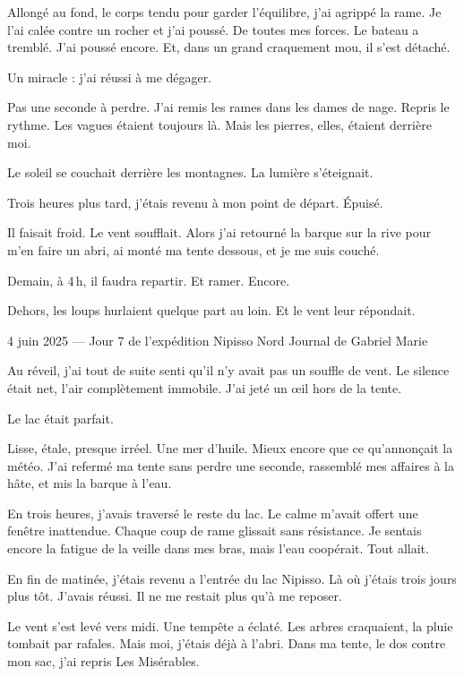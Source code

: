 Allongé au fond, le corps tendu pour garder l’équilibre, j’ai agrippé la rame. Je l’ai calée contre un rocher et j’ai poussé. De toutes mes forces. Le bateau a tremblé. J’ai poussé encore. Et, dans un grand craquement mou, il s’est détaché.

Un miracle : j’ai réussi à me dégager.

Pas une seconde à perdre. J’ai remis les rames dans les dames de nage. Repris le rythme. Les vagues étaient toujours là. Mais les pierres, elles, étaient derrière moi.

Le soleil se couchait derrière les montagnes. La lumière s’éteignait.

Trois heures plus tard, j’étais revenu à mon point de départ. Épuisé.

Il faisait froid. Le vent soufflait. Alors j’ai retourné la barque sur la rive pour m’en faire un abri, ai monté ma tente dessous, et je me suis couché.

Demain, à 4 h, il faudra repartir. Et ramer. Encore.

Dehors, les loups hurlaient quelque part au loin. Et le vent leur répondait.






4 juin 2025 — Jour 7 de l’expédition Nipisso Nord
Journal de Gabriel Marie

Au réveil, j’ai tout de suite senti qu’il n’y avait pas un souffle de vent. Le silence était net, l’air complètement immobile. J’ai jeté un œil hors de la tente.

Le lac était parfait.

Lisse, étale, presque irréel. Une mer d’huile. Mieux encore que ce qu’annonçait la météo. J’ai refermé ma tente sans perdre une seconde, rassemblé mes affaires à la hâte, et mis la barque à l’eau.

En trois heures, j’avais traversé le reste du lac. Le calme m’avait offert une fenêtre inattendue. Chaque coup de rame glissait sans résistance. Je sentais encore la fatigue de la veille dans mes bras, mais l’eau coopérait. Tout allait.

En fin de matinée, j’étais revenu a l’entrée du lac Nipisso. Là où j’étais trois jours plus tôt. J’avais réussi. Il ne me restait plus qu’à me reposer.

Le vent s’est levé vers midi. Une tempête a éclaté. Les arbres craquaient, la pluie tombait par rafales. Mais moi, j’étais déjà à l’abri. Dans ma tente, le dos contre mon sac, j’ai repris Les Misérables.

